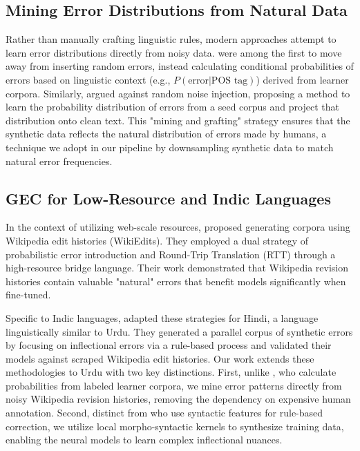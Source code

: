 \documentclass[11pt]{article}
\begin{document}
\subsection{Mining Error Distributions from Natural Data}
Rather than manually crafting linguistic rules, modern approaches attempt to learn error distributions directly from noisy data. \citet{felice-yuan-2014} were among the first to move away from inserting random errors, instead calculating conditional probabilities of errors based on linguistic context (e.g., $P(\text{error} | \text{POS tag})$) derived from learner corpora. Similarly, \citet{kasewa-2018} argued against random noise injection, proposing a method to learn the probability distribution of errors from a seed corpus and project that distribution onto clean text. This "mining and grafting" strategy ensures that the synthetic data reflects the natural distribution of errors made by humans, a technique we adopt in our pipeline by downsampling synthetic data to match natural error frequencies.

\subsection{GEC for Low-Resource and Indic Languages}
In the context of utilizing web-scale resources, \citet{jared} proposed generating corpora using Wikipedia edit histories (WikiEdits). They employed a dual strategy of probabilistic error introduction and Round-Trip Translation (RTT) through a high-resource bridge language. Their work demonstrated that Wikipedia revision histories contain valuable "natural" errors that benefit models significantly when fine-tuned.

Specific to Indic languages, \citet{hindi} adapted these strategies for Hindi, a language linguistically similar to Urdu. They generated a parallel corpus of synthetic errors by focusing on inflectional errors via a rule-based process and validated their models against scraped Wikipedia edit histories. Our work extends these methodologies to Urdu with two key distinctions. First, unlike \citet{felice-yuan-2014}, who calculate probabilities from labeled learner corpora, we mine error patterns directly from noisy Wikipedia revision histories, removing the dependency on expensive human annotation. Second, distinct from \citet{sidorov-2013} who use syntactic features for rule-based correction, we utilize local morpho-syntactic kernels to synthesize training data, enabling the neural models to learn complex inflectional nuances.
\end{document}
